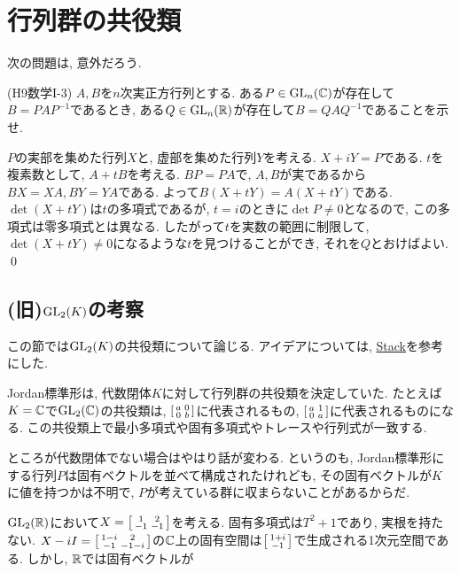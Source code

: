 \section{行列群の共役類}
次の問題は, 意外だろう.
\begin{egprob} (H9数学I-3)
$A,B$を$n$次実正方行列とする. ある$P\in \mathrm{GL}_{n}(\mathbb{C})$が存在して$B=PAP^{-1}$であるとき, ある$Q\in \mathrm{GL}_{n}(\mathbb{R})$が存在して$B=QAQ^{-1}$であることを示せ.
\end{egprob}
\begin{egans}
$P$の実部を集めた行列$X$と, 虚部を集めた行列$Y$を考える. $X+iY = P$である. $t$を複素数として, $A+tB$を考える. $BP=PA$で, $A,B$が実であるから$BX=XA, BY=YA$である. よって$B(X+tY) = A(X+tY)$である. $\det{(X+tY)}$は$t$の多項式であるが, $t=i$のときに$\det{P} \neq 0$となるので, この多項式は零多項式とは異なる. したがって$t$を実数の範囲に制限して,$\det{(X+tY)}\neq 0$になるような$t$を見つけることができ, それを$Q$とおけばよい. \qed
\end{egans}




\subsection{(旧)$\mathrm{GL}_{2}(K)$の考察}
この節では$\mathrm{GL}_{2}(K)$の共役類について論じる. アイデアについては, \href{https://math.stackexchange.com/questions/1416055/classification-of-all-conjugacy-classes-of-gl-2-mathbbr-gl-2-mathbbq}{Stack}を参考にした.\par
Jordan標準形は, 代数閉体$K$に対して行列群の共役類を決定していた. たとえば$K=\mathbb{C}$で$\mathrm{GL}_{2}(\mathbb{C})$の共役類は, $\left[\begin{smallmatrix}a&0\\ 0&b\end{smallmatrix}\right]$に代表されるもの, $\left[\begin{smallmatrix}a&1\\ 0&a\end{smallmatrix}\right]$に代表されるものになる. この共役類上で最小多項式や固有多項式やトレースや行列式が一致する. \par
ところが代数閉体でない場合はやはり話が変わる. というのも, Jordan標準形にする行列$P$は固有ベクトルを並べて構成されたけれども, その固有ベクトルが$K$に値を持つかは不明で, $P$が考えている群に収まらないことがあるからだ.

\begin{eg} $\mathrm{GL}_{2}(\mathbb{R})$において$X=\left[\begin{smallmatrix}1&2\\
-1&-1\end{smallmatrix}\right]$を考える. 固有多項式は$T^2+1$であり, 実根を持たない. $X-iI = \left[\begin{smallmatrix}1-i & 2\\ -1 & -1-i\end{smallmatrix}\right]$の$\mathbb{C}$上の固有空間は$\left[\begin{smallmatrix}1+i\\ -1\end{smallmatrix}\right]$で生成される1次元空間である. しかし, $\mathbb{R}$では固有ベクトルが
\end{eg}

